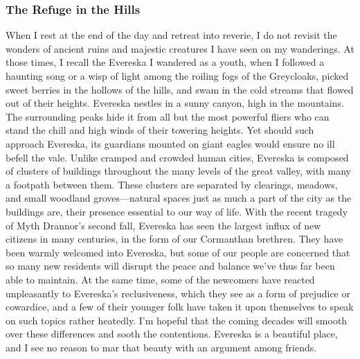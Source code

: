 \documentclass[10pt,a4paper,twoside,twocolumn,openany,bg=print,nodeprecatedcode]{dndbook}
\begin{document}
\subsubsection{The Refuge in the Hills}
When I rest at the end of the day and retreat into reverie, I do not revisit the wonders of ancient ruins and majestic creatures I have seen on my wanderings. At those times, I recall the Evereska I wandered as a youth, when I followed a haunting song or a wisp of light among the roiling fogs of the Greycloaks, picked sweet berries in the hollows of the hills, and swam in the cold streams that flowed out of their heights.
Evereska nestles in a sunny canyon, high in the
mountains. The surrounding peaks hide it from all but the most powerful fliers who can stand the chill and high winds of their towering heights. Yet should such approach Evereska, its guardians mounted on giant eagles would ensure no ill befell the vale.
Unlike cramped and crowded human cities, Evereska is composed of clusters of buildings throughout the many levels of the great valley, with many a footpath between them. These clusters are separated by clearings, meadows, and small woodland groves—natural spaces just as much a part of the city as the buildings are, their presence essential to our way of life.
With the recent tragedy of Myth Drannor's second fall, Evereska has seen the largest influx of new citizens in many centuries, in the form of our Cormanthan brethren. They have been warmly welcomed into Evereska, but some of our people are concerned that so many new residents will disrupt the peace and balance we've thus far been able to maintain. At the same time, some of the newcomers have reacted unpleasantly to Evereska's reclusiveness, which they see as a form of prejudice or cowardice, and a few of their younger folk have taken it upon themselves to speak on such topics rather heatedly. I'm hopeful that the coming decades will smooth over these differences and sooth the contentions. Evereska is a beautiful place, and I see no reason to mar that beauty with an argument among friends.
\end{document}
